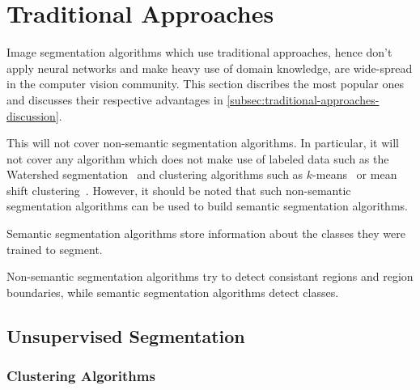 \section{Traditional Approaches}%
\label{sec:traditional-approaches}%
Image segmentation algorithms which use traditional approaches, hence don't
apply neural networks and make heavy use of domain knowledge, are wide-spread
in the computer vision community. This section discribes the most popular ones
and discusses their respective advantages in
\cref{subsec:traditional-approaches-discussion}.

This will not cover non-semantic segmentation algorithms. In particular, it
will not cover any algorithm which does not make use of labeled data such as
the Watershed segmentation~\cite{beucher1992morphological} and clustering
algorithms such as $k$-means~\cite{hartigan1975clustering} or mean shift
clustering~\cite{comaniciu2002mean}. However, it should be noted that such
non-semantic segmentation algorithms can be used to build semantic segmentation
algorithms.

Semantic segmentation algorithms store information about the classes they were
trained to segment.

Non-semantic segmentation algorithms try to detect consistant regions and
region boundaries, while semantic segmentation algorithms detect classes.

\subsection{Unsupervised Segmentation}%
\label{subsec:unsupervised-traditional-segmentation}%

\subsubsection{Clustering Algorithms}
%


